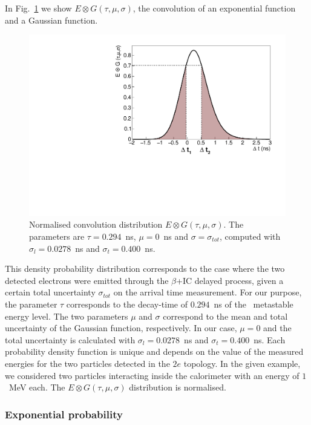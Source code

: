 In Fig.~\ref{fig:Pexp} we show $E \otimes G(\tau,\mu,\sigma)$, the convolution of an exponential function and a Gaussian function.
\begin{figure}
  \centering
  \includegraphics[width=13cm]{timedifference/fig_timediff/proba_expo.pdf}
  \caption{Normalised convolution distribution $E \otimes G (\tau,\mu,\sigma)$.
    The parameters are $\tau=0.294$~ns, $\mu=0$~ns and $\sigma=\sigma_{tot}$, computed with $\sigma_{l}=0.0278$~ns and $\sigma_{t}=0.400$~ns.
    \label{fig:Pexp}}
\end{figure}
This density probability distribution corresponds to the case where the two detected electrons were emitted through the $\beta$+IC delayed process, given a certain total uncertainty $\sigma_{tot}$ on the arrival time measurement.
For our purpose, the parameter $\tau$ corresponds to the decay-time of $0.294$~ns of the \Tl\ metastable energy level.
The two parameters $\mu$ and $\sigma$ correspond to the mean and total uncertainty of the Gaussian function, respectively.
In our case, $\mu=0$ and the total uncertainty is calculated with $\sigma_{l}=0.0278$~ns and $\sigma_{t}=0.400$~ns.
Each probability density function is unique and depends on the value of the measured energies for the two particles detected in the $2e$ topology.
In the given example, we considered two particles interacting inside the calorimeter with an energy of $1$~MeV each.
The $E \otimes G(\tau,\mu,\sigma)$ distribution is normalised.



\subsubsection{Exponential probability}

